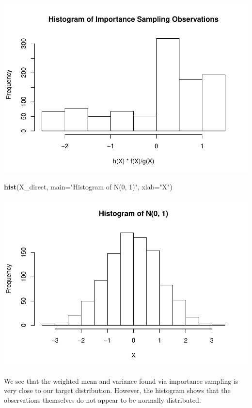 \documentclass[]{article}
\newenvironment{Shaded}{\begin{snugshade}}{\end{snugshade}}
\newcommand{\KeywordTok}[1]{\textcolor[rgb]{0.13,0.29,0.53}{\textbf{{#1}}}}
\newcommand{\DataTypeTok}[1]{\textcolor[rgb]{0.13,0.29,0.53}{{#1}}}
\newcommand{\StringTok}[1]{\textcolor[rgb]{0.31,0.60,0.02}{{#1}}}
\newcommand{\NormalTok}[1]{{#1}}
\begin{document}
\includegraphics{Atlas-PS_5_files/figure-latex/unnamed-chunk-1-1.pdf}

\begin{Shaded}
\begin{Highlighting}[]
\KeywordTok{hist}\NormalTok{(X_direct, }\DataTypeTok{main=}\StringTok{"Histogram of N(0, 1)"}\NormalTok{, }\DataTypeTok{xlab=}\StringTok{"X"}\NormalTok{)}
\end{Highlighting}
\end{Shaded}

\includegraphics{Atlas-PS_5_files/figure-latex/unnamed-chunk-1-2.pdf}

We see that the weighted mean and variance found via importance sampling
is very close to our target distribution. However, the histogram shows
that the observations themselves do not appear to be normally
distributed.
\end{document}
